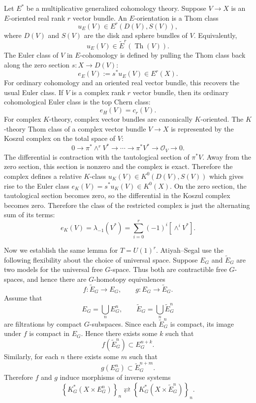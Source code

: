 \documentclass[12pt]{article}
\begin{document}
\begin{remark}
Let $E^*$ be a multiplicative generalized cohomology theory. Suppose
$V\to X$ is an $E$-oriented real rank $r$ vector bundle. An $E$-orientation is
a Thom class
\[
    u_E(V)\in E^r(D(V),S(V)),
\]
where $D(V)$ and $S(V)$ are the disk and sphere bundles of $V$. Equivalently,
\[
    u_E(V)\in \widetilde E^r(\operatorname{Th}(V)).
\]
The Euler class of $V$ in $E$-cohomology is defined by pulling the Thom class
back along the zero section $s:X\to D(V)$:
\[
    e_E(V):=s^*u_E(V)\in E^r(X).
\]
For ordinary cohomology and an oriented real vector bundle, this recovers the
usual Euler class. If $V$ is a complex rank $r$ vector bundle, then its
ordinary cohomological Euler class is the top Chern class:
\[
    e_H(V)=c_r(V).
\]
For complex $K$-theory, complex vector bundles are canonically $K$-oriented.
The $K$-theory Thom class of a complex vector bundle $V\to X$ is represented
by the Koszul complex on the total space of $V$:
\[
    0
    \longrightarrow
    \pi^*\wedge^r V^*
    \longrightarrow
    \cdots
    \longrightarrow
    \pi^*V^*
    \longrightarrow
    \mathcal O_V
    \longrightarrow
    0.
\]
The differential is contraction with the tautological section of $\pi^*V$.
Away from the zero section, this section is nonzero and the complex is exact.
Therefore the complex defines a relative $K$-class $u_K(V)\in K^0(D(V),S(V))$ which gives rise to the Euler class $e_K(V)=s^*u_K(V)\in K^0(X)$. On the zero section, the tautological section becomes zero, so the differential
in the Koszul complex becomes zero. Therefore the class of the restricted
complex is just the alternating sum of its terms:
\[
    e_K(V)=\lambda_{-1}(V^*)
    =
    \sum_{i=0}^r(-1)^i[\wedge^iV^*].
\]
\end{remark}

Now we establish the same lemma for $T = U(1)^r$. 
Atiyah--Segal use the following flexibility about the choice of universal
space. Suppose $E_G$ and $\widetilde E_G$ are two models for the universal
free $G$-space. Thus both are contractible free $G$-spaces, and hence there
are $G$-homotopy equivalences
\[
    f:\widetilde E_G\to E_G,
    \qquad
    g:E_G\to \widetilde E_G.
\]
Assume that
\[
    E_G=\bigcup_n E_G^n,
    \qquad
    \widetilde E_G=\bigcup_n \widetilde E_G^n
\]
are filtrations by compact $G$-subspaces. Since each $\widetilde E_G^n$ is compact, its image under $f$ is compact in
$E_G$. Hence there exists some $k$ such that
\[
    f(\widetilde E_G^n)\subset E_G^{n+k}.
\]
Similarly, for each $n$ there exists some $m$ such that
\[
    g(E_G^n)\subset \widetilde E_G^{n+m}.
\]
Therefore $f$ and $g$ induce morphisms of inverse systems
\[
    \left\{K_G^*(X\times E_G^n)\right\}_n
    \rightleftarrows
    \left\{K_G^*(X\times \widetilde E_G^n)\right\}_n.
\]
\end{document}
